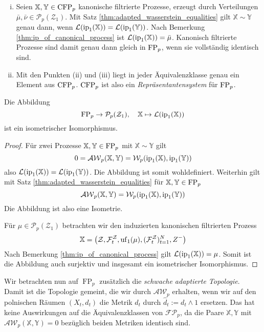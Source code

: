 \begin{remark}
\begin{enumerate}[(i)]
    \item Seien $\mathbb{X,Y}\in \operatorname{CFP}_p$ kanonische filtrierte Prozesse, erzeugt durch Verteilungen $\bar{\mu},\bar{\nu} \in \mathcal{P}_p(\mathcal{Z}_1)$. Mit Satz \ref{thm:adapted_wasserstein_equalities} gilt $\mathbb{X} \sim \mathbb{Y}$ genau dann, wenn $\mathcal{L}(\operatorname{ip}_1(\mathbb{X})) = \mathcal{L}(\operatorname{ip}_1(\mathbb{Y}))$. Nach Bemerkung \ref{thm:ip_of_canonical_process} ist $\mathcal{L}(\operatorname{ip}_1(\mathbb{X}))=\bar{\mu}$. Kanonisch filtrierte Prozesse sind damit genau dann gleich in $\operatorname{FP}_p$, wenn sie vollständig identisch sind. 
    \item Mit den Punkten (ii) und (iii) liegt in jeder Äquivalenzklasse genau ein Element aus $\operatorname{CFP}_p$. $\operatorname{CFP}_p$ ist also ein \emph{Repräsentantensystem} für $\operatorname{FP}_p$.
\end{enumerate}
\end{remark}
\begin{lemma}\label{thm:isometric_fp_pz}
    Die Abbildung 
    $$\operatorname{FP}_p \rightarrow \mathcal{P}_p(\mathcal{Z}_1), \quad \mathbb{X} \mapsto \mathcal{L}(\operatorname{ip}_1(\mathbb{X}))$$
     ist ein isometrischer Isomorphismus.
\end{lemma}
\begin{proof}
    Für zwei Prozesse $\mathbb{X,Y} \in \operatorname{FP}_p$ mit $\mathbb{X}\sim \mathbb{Y}$ gilt 
    $$0=\mathcal{AW}_p(\mathbb{X}, \mathbb{Y}) = \mathcal{W}_p(\operatorname{ip}_1(\mathbb{X}), \operatorname{ip}_1(\mathbb{Y}))$$
    also $\mathcal{L}(\operatorname{ip}_1(\mathbb{X})) = \mathcal{L}(\operatorname{ip}_1(\mathbb{Y}))$. Die Abbildung ist somit wohldefiniert. Weiterhin gilt mit Satz \ref{thm:adapted_wasserstein_equalities} für $\mathbb{X,Y} \in \operatorname{FP}_p$
    $$\mathcal{AW}_p(\mathbb{X,Y}) = \mathcal{W}_p(\operatorname{ip}_1(\mathbb{X}), \operatorname{ip}_1(\mathbb{Y}))$$
    Die Abbildung ist also eine Isometrie. 

    Für $\mu \in \mathcal{P}_p(\mathcal{Z}_1)$ betrachten wir den induzierten kanonischen filtrierten Prozess
    $$\mathbb{X} = \left( \mathcal{Z}, \mathcal{F}_t^\mathcal{Z}, \operatorname{uf}_1(\mu), (\mathcal{F}_t^\mathcal{Z})_{t=1}^N, Z^-\right)$$
    Nach Bemerkung \ref{thm:ip_of_canonical_process} gilt $\mathcal{L}(\operatorname{ip}_1(\mathbb{X})) = \mu$. Somit ist die Abbildung auch surjektiv und insgesamt ein isometrischer Isomorphismus.
\end{proof}
Wir betrachten nun auf $\operatorname{FP}_p$ zusätzlich die \emph{schwache adaptierte Topologie}. Damit ist die Topologie gemeint, die wir durch $\mathcal{AW}_p$ erhalten, wenn wir auf den polnischen Räumen $(X_t, d_t)$ die Metrik $d_t$ durch $\widehat{d}_t := d_t \wedge 1$ ersetzen. Das hat keine Auswirkungen auf die Äquivalenzklassen von $\mathcal{FP}_p$, da die Paare $\mathbb{X,Y}$ mit $\mathcal{AW}_p(\mathbb{X,Y})=0$ bezüglich beiden Metriken identisch sind.
